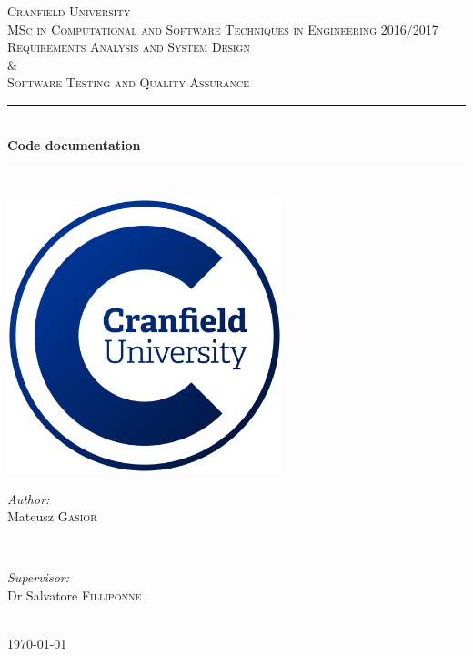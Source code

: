 \begin{titlepage}
		\newcommand{\HRule}{\rule{\linewidth}{0.5mm}}
		
		\center
		
		\textsc{\LARGE Cranfield University}\\[1.5cm]
		\textsc{\Large MSc in Computational and Software Techniques in Engineering 2016/2017}\\[0.5cm]
		\textsc{\large Requirements Analysis and System Design \\ \& \\Software Testing and Quality Assurance}\\[0.5cm]
		
		\HRule \\[0.4cm]
		{ \huge \bfseries Code documentation}\\[0.4cm]
		\HRule \\[1.5cm]
		
		\includegraphics[width=8cm]{img/cranfield-logo}\\[1cm]
		
		\vfill
		\begin{minipage}{0.4\textwidth}
			\begin{flushleft} \large
				\emph{Author:}\\
				Mateusz \textsc{Gasior}
			\end{flushleft}
		\end{minipage}
		~
		\begin{minipage}{0.4\textwidth}
			\begin{flushright} \large
				\emph{Supervisor:} \\
				Dr Salvatore \textsc{Filliponne}
			\end{flushright}
		\end{minipage}\\[2cm]
		
		\vfill
		{\large \today}
		\clearpage
	\end{titlepage}